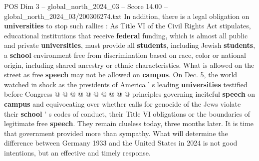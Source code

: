 \begin{textsample}{POS Dim 3 – global\_north\_2024\_03 – Score 14.00 – global\_north\_2024\_03/200306274.txt}
In addition, there is a legal obligation on \textbf{universities} to stop such rallies : As Title VI of the Civil Rights Act stipulates, educational institutions that receive \textbf{federal} funding, which is almost all public and private \textbf{universities}, must provide all \textbf{students}, including Jewish \textbf{students}, a \textbf{school} environment free from discrimination based on race, color or national origin, including shared ancestry or ethnic characteristics.
What is allowed on the street as free \textbf{speech} may not be allowed on \textbf{campus}.
On Dec. 5, the world watched in shock as the presidents of America ' s leading \textbf{universities} testified before Congress @ @ @ @ @ @ @ @ @ @ principles governing inciteful \textbf{speech} on \textbf{campus} and equivocating over whether calls for genocide of the Jews violate their \textbf{school} ' s codes of conduct, their Title VI obligations or the boundaries of legitimate free \textbf{speech}.
They remain clueless today, three months later.
It is time that government provided more than sympathy.
What will determine the difference between Germany 1933 and the United States in 2024 is not good intentions, but an effective and timely response.

\end{textsample}

